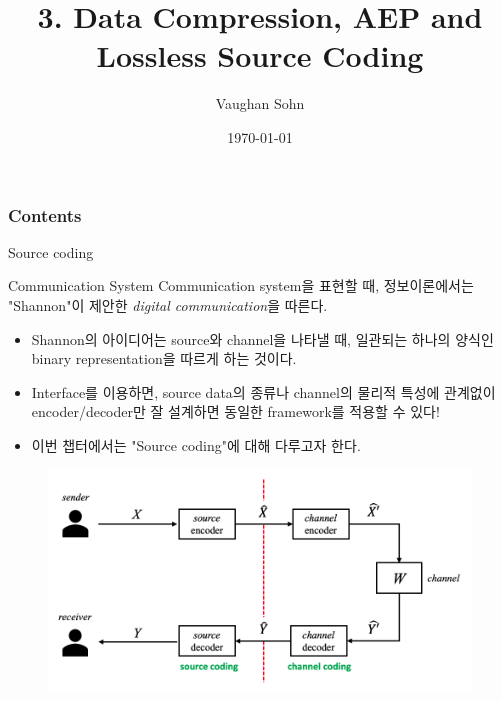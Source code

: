 \documentclass[9pt]{beamer}
\title{3. Data Compression, AEP and Lossless Source Coding}
\date{\today}
\author{Vaughan Sohn}
\begin{document}
    \maketitle
    
    \begin{frame}
        \frametitle{Contents}
        \tableofcontents
    \end{frame}

    
    \begin{section}{Source coding}
        \begin{frame}{Communication System}
            Communication system을 표현할 때, 정보이론에서는 "Shannon"이 제안한 \textit{digital communication}을 따른다.
            \begin{itemize}
                \item Shannon의 아이디어는 source와 channel을 나타낼 때, 일관되는 하나의 양식인 binary representation을 따르게 하는 것이다.
                \item Interface를 이용하면, source data의 종류나 channel의 물리적 특성에 관계없이 encoder/decoder만 잘 설계하면 동일한 framework를 적용할 수 있다!
                \item 이번 챕터에서는 "Source coding"에 대해 다루고자 한다.
            \end{itemize}
            \begin{figure}
                \includegraphics[width=0.7\columnwidth]{image/transmission_system_overview.png}
            \end{figure}
        \end{frame}


\end{section}
\end{document}
